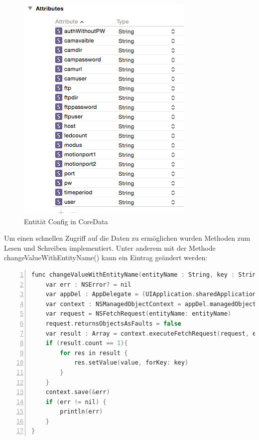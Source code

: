 \begin{figure}[h]
	\begin{minipage}{0.5\textwidth}
		\centering
		\includegraphics[width=\textwidth]{./data/entityconfig.png}
		\caption{Entität Config in CoreData}
	\end{minipage}
\end{figure}

Um einen schnellen Zugriff auf die Daten zu ermöglichen wurden Methoden zum Lesen und Schreiben implementiert. Unter anderem mit der Methode changeValueWithEntityName() kann ein Eintrag geändert werden: 
\begin{lstlisting}[caption = Implementierung CoreData-Zugriff, language=C++, frame=single, breaklines=true,columns=fullflexible, commentstyle=\color{gray}\upshape, captionpos=b, numbers = left]
func changeValueWithEntityName(entityName : String, key : String, value : AnyObject) {
    var err : NSError? = nil
    var appDel : AppDelegate = (UIApplication.sharedApplication().delegate as! AppDelegate)
    var context : NSManagedObjectContext = appDel.managedObjectContext!
    var request = NSFetchRequest(entityName: entityName)
    request.returnsObjectsAsFaults = false
    var result : Array = context.executeFetchRequest(request, error: &err)! as Array
    if (result.count == 1){
	    for res in result {
		    res.setValue(value, forKey: key)
	    }
    }
    context.save(&err)
    if (err != nil) {
	    println(err)
    }
}
\end{lstlisting}

